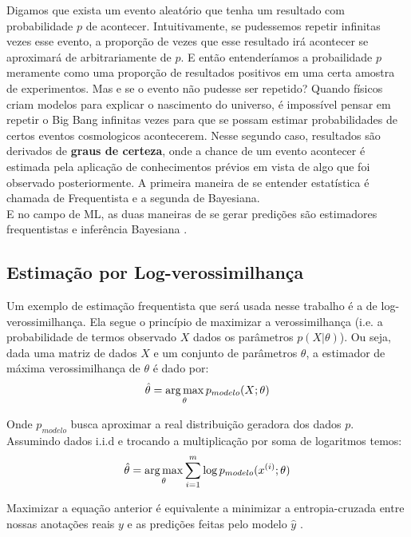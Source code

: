 Digamos que exista um evento aleatório que tenha um resultado com probabilidade $p$ de acontecer. Intuitivamente, se pudessemos repetir infinitas vezes esse evento, a proporção de vezes que esse resultado irá acontecer se aproximará de arbitrariamente de $p$. E então entenderíamos a probailidade $p$ meramente como uma proporção de resultados positivos em uma certa amostra de experimentos. Mas e se o evento não pudesse ser repetido? Quando físicos criam modelos para explicar o nascimento do universo, é impossível pensar em repetir o Big Bang infinitas vezes para que se possam estimar probabilidades de certos eventos cosmologicos acontecerem. Nesse segundo caso, resultados são derivados de \textbf{graus de certeza}, onde a chance de um evento acontecer é estimada pela aplicação de conhecimentos prévios em vista de algo que foi observado posteriormente. A primeira maneira de se entender estatística é chamada de Frequentista e a segunda de Bayesiana. \\

E no campo de ML, as duas maneiras de se gerar predições são estimadores frequentistas e inferência Bayesiana \citep{dlbook}.

\subsection{Estimação por Log-verossimilhança}

Um exemplo de estimação frequentista que será usada nesse trabalho é a de log-verossimilhança. 
Ela segue o princípio de maximizar a verossimilhança (i.e. a probabilidade de
termos observado $X$ dados os parâmetros $p(X | \theta)$). Ou seja, dada uma matriz de dados $X$ e um conjunto de parâmetros $\theta$, a estimador de máxima verossimilhança de $\theta$ é dado por: \\

\[ \hat{\theta} = \operatorname*{arg\,max}_{\theta} p_{modelo}(X;\theta) \] 

Onde $p_{modelo}$ busca aproximar a real distribuição geradora dos dados $p$. Assumindo dados i.i.d e trocando a multiplicação por soma de logaritmos temos: \\

\[ \hat{\theta} = \operatorname*{arg\,max}_{\theta} \sum_{i=1}^{m} \log p_{modelo}(x^{(i)};\theta) \]

Maximizar a equação anterior é equivalente a minimizar a entropia-cruzada entre
nossas anotações reais $y$ e as predições feitas pelo modelo $\hat{y}$
\citep{dlbook}. \\


